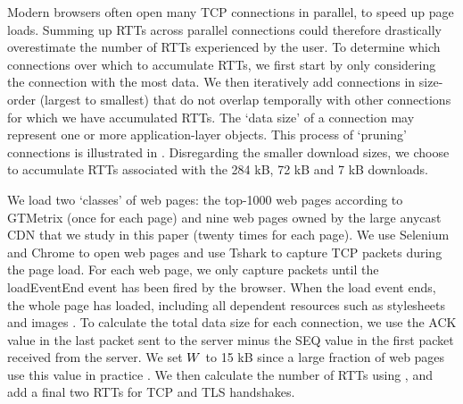 \documentclass[sigconf,letterpaper,nonacm,10pt,anonymous]{acmart}
\begin{document}
\fi

Modern browsers often open many TCP connections in parallel, to speed up
page loads. Summing up RTTs across parallel connections could therefore
drastically overestimate the number of RTTs experienced by the user.
To determine which connections over which to accumulate RTTs, we
first start by only considering the connection with the most data. We
then iteratively add connections in size-order (largest to smallest)
that do not overlap temporally with other connections for which we have
accumulated RTTs. The `data size' of a connection may represent one or
more application-layer objects. This process of `pruning' connections is
illustrated in . Disregarding the
smaller download sizes, we choose to accumulate RTTs associated with the
284 kB, 72 kB and 7 kB downloads.

We load two `classes' of web pages: the top-1000 web pages according to
GTMetrix \cite{gtmetrix} (once for each page) and nine web pages owned
by the large anycast CDN that we study in this paper (twenty times for
each page). We use Selenium and Chrome to open web pages and use Tshark
\cite{tshark} to capture TCP packets during the page load. For each web
page, we only capture packets until the loadEventEnd event has been
fired by the browser. When the load event ends, the whole page has
loaded, including all dependent resources such as stylesheets and images
\cite{web_api_load_event}. To calculate the total data size for each
connection, we use the ACK value in the last packet sent to the server
minus the SEQ value in the first packet received from the server. We set
\(\mathnormal{W}\) to 15 kB since a large fraction of web pages use this
value in practice \cite{iwIMC17}. We then calculate the number of RTTs
using , and add a final two RTTs for TCP and
TLS handshakes.
\end{document}
